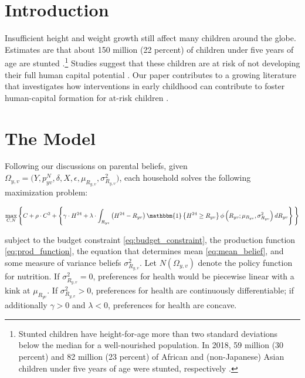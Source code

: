 \section{Introduction}

Insufficient height and weight growth still affect many children around the globe. Estimates are that about 150 million (22 percent) of children under five years of age are stunted \autocite{fao_state_2019}.\footnote{Stunted children have height-for-age more than two standard deviations below the median for a well-nourished population. In 2018, 59 million (30 percent) and 82 million (23 percent) of African and (non-Japanese) Asian children under five years of age were stunted, respectively \autocite{fao_state_2019}.} Studies suggest that these children are at risk of not developing their full human capital potential \autocite{behrman_nutritional_2009, black_early_2017, hoddinott_effect_2008, hoddinott_adult_2013, hoddinott_economic_2013, maluccio_impact_2009, richter_investing_2017, victora_maternal_2008}. Our paper contributes to a growing literature that investigates how interventions in early childhood can contribute to foster human-capital formation for at-risk children \autocite[e.g.,][]{carneiro_heckman_2003, cunha_heckman_2007, cunha_heckman_jeea, cunha_heckman_schennach_2010, heckman_etal_jpube2010, heckman_etal_qe2010, heckman_etal_aer2010, campbell_etal_2014, gertler_etal_2014}.

\section{The Model}

Following our discussions on parental beliefs, given $\Omega_{y,v} = \big(Y, p^{N}_{yv}, \delta, X, \epsilon, \mu_{R_{y,v}}, \sigma_{R_{y,v}}^{2} \big)$, each household solves the following maximization problem:

\begin{equation}
\label{eq:optimain}
\max_{C,N} \Bigg\{C+\rho\cdot C^{2}+  \left\{ \gamma\cdot H^{24}+\lambda \cdot \int_{R_{yv}} \left(H^{24}-R_{yv}\right)\mathbbm{1}\left\{ H^{24}\ge R_{yv}\right\}\phi \left(R_{yv};\mu_{R_{yv}}, \sigma_{R_{yv}}^{2} \right) dR_{yv} \right\} \Bigg\}
\end{equation}

subject to the budget constraint \eqref{eq:budget_constraint}, the production function \eqref{eq:prod_function}, the equation that determines mean \eqref{eq:mean_belief}, and some measure of variance beliefs $\sigma^2_{R_{y,v}}$. Let $N\left(\Omega_{y,v}\right)$ denote the policy function for nutrition. If $\sigma^2_{R_{y,v}}=0$, preferences for health would be piecewise linear with a kink at $\mu_{R_{yv}}$. If $\sigma^2_{R_{y,v}}>0$, preferences for health are continuously differentiable; if additionally $\gamma>0$ and $\lambda<0$, preferences for health are concave.

